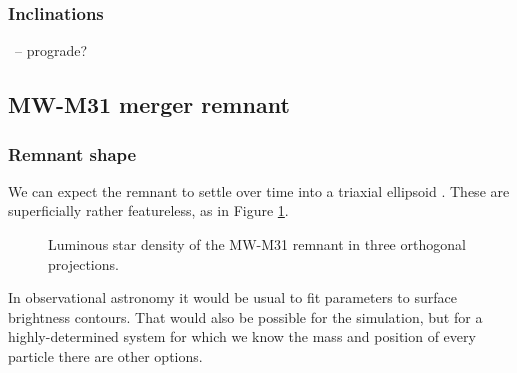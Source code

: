 \documentclass[twocolumn]{aastex63}
\newcommand{\todo}{\color{red}{TODO}\color{black}\hspace{2mm}}
\begin{document}
\todo{changes in mass profile}

\subsubsection{Inclinations}

\todo{Relative rotation axes of disks}\ -- prograde?



\subsection{MW-M31 merger remnant}


\subsubsection{Remnant shape}

\todo{how to get principal axes? boxiness?}

We can expect the remnant to settle over time into a triaxial ellipsoid \todo{ref?}. These are superficially rather featureless, as in Figure \ref{fig:rem_shape}. 

\begin{figure}[htb!]
	\caption{Luminous star density of the MW-M31 remnant in three orthogonal projections.
		\label{fig:rem_shape}}
\end{figure}

In observational astronomy it would be usual to fit parameters to surface brightness contours. That would also be possible for the simulation, but for a highly-determined system for which we know the mass and position of every particle there are other options.
\end{document}
